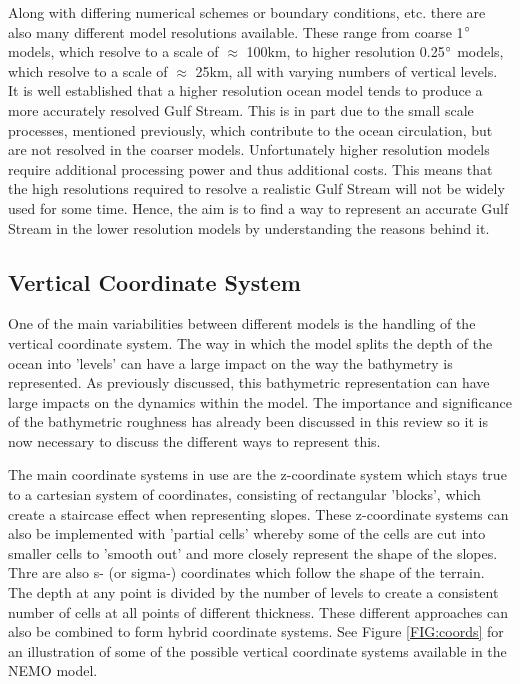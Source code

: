 \documentclass[..\EOYR.tex]{subfiles}
\begin{document}
	Along with differing numerical schemes or boundary conditions, etc. there are also many different model resolutions available. These range from coarse 1$\degree$ models, which resolve to a scale of $\approx$ 100km, to higher resolution 0.25$\degree$ models, which resolve to a scale of $\approx$ 25km, all with varying numbers of vertical levels. It is well established \citep{Scaife2011a}\citep{Hurlburt2008} that a higher resolution ocean model tends to produce a more accurately resolved Gulf Stream. This is in part due to the small scale processes, mentioned previously, which contribute to the ocean circulation, but are not resolved in the coarser models. Unfortunately higher resolution models require additional processing power and thus additional costs. This means that the high resolutions required to resolve a realistic Gulf Stream will not be widely used for some time. Hence, the aim is to find a way to represent an accurate Gulf Stream in the lower resolution models by understanding the reasons behind it.

\subsection*{Vertical Coordinate System}

	One of the main variabilities between different models is the handling of the vertical coordinate system. The way in which the model splits the depth of the ocean into 'levels' can have a large impact on the way the bathymetry is represented. As previously discussed, this bathymetric representation can have large impacts on the dynamics within the model. The importance and significance of the bathymetric roughness has already been discussed in this review so it is now necessary to discuss the different ways to represent this.
    \par
The main coordinate systems in use are the z-coordinate system which stays true to a cartesian system of coordinates, consisting of rectangular 'blocks', which create a staircase effect when representing slopes. These z-coordinate systems can also be implemented with 'partial cells' whereby some of the cells are cut into smaller cells to 'smooth out' and more closely represent the shape of the slopes. Thre are also s- (or sigma-) coordinates which follow the shape of the terrain. The depth at any point is divided by the number of levels to create a consistent number of cells at all points of different thickness. These different approaches can also be combined to form hybrid coordinate systems. See Figure \ref{FIG:coords} for an illustration of some of the possible vertical coordinate systems available in the NEMO model.
\end{document}

